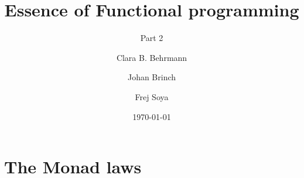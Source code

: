 \documentclass{beamer}
\title{Essence of Functional programming}
\subtitle{Part 2}
\author{Clara B. Behrmann \and Johan Brinch  \and  Frej Soya}
\date{\today}
\begin{document}
\lstset{basicstyle=\footnotesize\ttfamily}
\begin{frame}
  \titlepage
\end{frame}

\begin{frame}
  \tableofcontents
\end{frame}


\section{The Monad laws}
\end{document}
